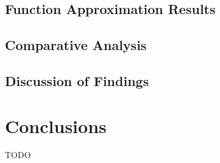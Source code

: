 \documentclass[10pt, conference]{IEEEtran}
\begin{document}
\subsection{Function Approximation Results}

\subsection{Comparative Analysis}


\subsection{Discussion of Findings}

\section{Conclusions}
TODO



\end{document}
